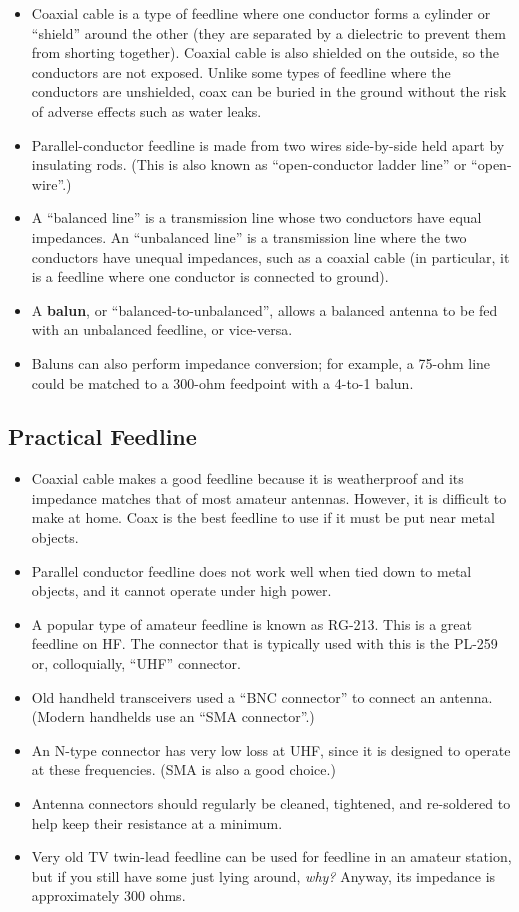 \documentclass[letterpaper,12pt]{article}
\begin{document}
\begin{itemize}
\item Coaxial cable is a type of feedline where one conductor forms a cylinder or ``shield'' around the other (they are separated by a dielectric to prevent
them from shorting together). Coaxial cable is also shielded on the outside, so the conductors are not exposed. Unlike some types of feedline
where the conductors are unshielded, coax can be buried in the ground without the risk of adverse effects such as water leaks.
\item Parallel-conductor feedline is made from two wires side-by-side held apart by insulating rods.
(This is also known as ``open-conductor ladder line'' or ``open-wire''.)
\item A ``balanced line'' is a transmission line whose two conductors have equal impedances. An ``unbalanced line'' is a transmission line
where the two conductors have unequal impedances, such as a coaxial cable (in particular, it is a feedline where one conductor is connected to ground).
\item A \textbf{balun}, or ``balanced-to-unbalanced'', allows a balanced antenna to be fed with an unbalanced feedline, or vice-versa.
\item Baluns can also perform impedance conversion; for example, a 75-ohm line could be matched to a 300-ohm feedpoint with a 4-to-1 balun.
\end{itemize}

\subsection{Practical Feedline}

\begin{itemize}
\item Coaxial cable makes a good feedline because it is weatherproof and its impedance matches that of most amateur antennas. However, it is difficult to make at home.
Coax is the best feedline to use if it must be put near metal objects. 
\item Parallel conductor feedline does not work well when tied down to metal objects, and it cannot operate under high power. 
\item A popular type of amateur feedline is known as RG-213.
This is a great feedline on HF.
 The connector that is typically used with this is the PL-259 or, colloquially, ``UHF'' connector.
\item Old handheld transceivers used a ``BNC connector'' to connect an antenna. (Modern handhelds use an ``SMA connector''.)
\item An N-type connector has very low loss at UHF, since it is designed to operate at these frequencies. (SMA is also a good choice.)
\item Antenna connectors should regularly be cleaned, tightened, and re-soldered to help keep their resistance at a minimum.
\item Very old TV twin-lead feedline can be used for feedline in an amateur station, but if you still have some just lying around, \textit{why?}
Anyway, its impedance is approximately 300 ohms.
\end{itemize}
\end{document}
